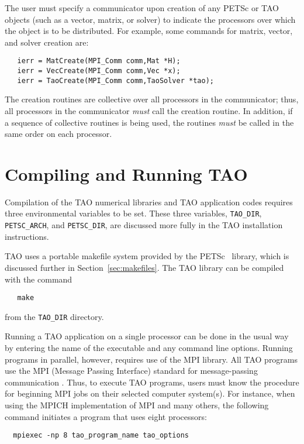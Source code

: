 The user must specify a communicator
upon creation of any PETSc or TAO objects (such as a vector, matrix, or solver)
to indicate the processors over which the object is to be distributed.
For example, some commands for matrix, vector, and solver creation
are:
\begin{verbatim}
   ierr = MatCreate(MPI_Comm comm,Mat *H);
   ierr = VecCreate(MPI_Comm comm,Vec *x);
   ierr = TaoCreate(MPI_Comm comm,TaoSolver *tao); 
\end{verbatim}
\noindent
The creation routines are collective over all processors in the
communicator; thus, all processors in the communicator {\em must} call
the creation routine.  In addition, if a sequence of collective
routines is being used, the routines {\em must} be called in the same
order on each processor.

\section{Compiling and Running TAO}
\label{sec:running}

Compilation of the TAO numerical libraries and TAO application codes
requires three environmental variables to be set.  These three
variables, \texttt{TAO\_DIR}, \texttt{PETSC\_ARCH}, and \texttt{PETSC\_DIR},
are discussed more fully in the TAO installation instructions.

TAO uses a portable makefile system provided by the
PETSc~\cite{petsc-web-page,petsc-user-ref} library, which is discussed
further in Section~\ref{sec:makefiles}.  The TAO library can be
compiled with the command
\begin{verbatim}
   make
\end{verbatim}
\noindent
from the \texttt{TAO\_DIR} directory.  

Running a TAO application on a single processor can be done in the
usual way by entering the name of the executable and any command line
options.  Running programs in parallel, however, requires use of the
MPI library.  All TAO programs use the MPI (Message Passing Interface)
standard for message-passing communication \cite{MPI-final}.  Thus, to
execute TAO programs, users must know the procedure for beginning MPI
jobs on their selected computer system(s).  For instance, when using
the MPICH implementation of MPI \cite{mpich-web-page} and many others,
the following command initiates a program that uses eight processors:
\begin{verbatim}
  mpiexec -np 8 tao_program_name tao_options
\end{verbatim}

